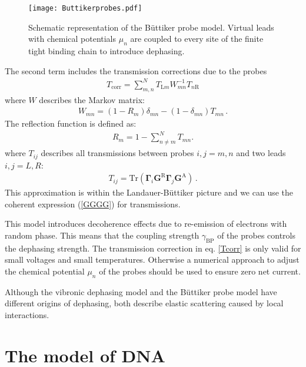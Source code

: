 \documentclass[reprint,superscriptaddress,nofootinbib,amsmath,amssymb,prb,floatfix]{revtex4-1}
\begin{document}
\begin{figure}[b]
   \texttt{[image: Buttikerprobes.pdf]}
   \caption{Schematic representation of the B\"uttiker probe model. Virtual leads with chemical potentials $\mu_n$ are coupled to every site of the finite tight binding chain to introduce dephasing. \label{BPPic}}
\end{figure}

The second term includes the transmission corrections due to the probes
\begin{align}\label{Tcorr}
 T_\text{corr} = \sum_{m,n}^N T_{\text{L}m} W^{-1}_{mn} T_{n\text{R}}
\end{align}
where $W$ describes the Markov matrix:
\begin{align}
  W_{mn} = (1-R_m)\delta_{mn} - (1-\delta_{mn})T_{mn}\,.
\end{align}
The reflection function is defined as:
\begin{align}
    R_m = 1-\sum_{n\neq m}^N T_{mn}.  
\end{align}
%
where $T_{ij}$ describes all transmissions between probes $i,j=m,n$ and two leads $i,j=L,R$:
\begin{align}\label{GGGG}
  T_{ij} = \text{Tr}\left(\boldsymbol{\Gamma}_i \textbf{G}^\text{R} \boldsymbol{\Gamma}_j \textbf{G}^\text{A} \right) \, .
\end{align}
%
This approximation is within the Landauer-B\"uttiker picture and we can use the coherent expression
(\ref{GGGG}) for transmissions.

This model introduces decoherence effects due to re-emission of electrons with random phase. This
means that the coupling strength $\gamma_\text{BP}$ of the probes controls the dephasing
strength. The transmission correction in eq. \eqref{Tcorr} is only valid for small voltages and
small temperatures. Otherwise a numerical approach to adjust the chemical potential $\mu_n$ of the
probes should be used to ensure zero net
current.\cite{golizadeh-mojarad_nonequilibrium_2007,kim_intermediate_2016,Korol1712.08515}

Although the vibronic dephasing model and the B\"uttiker probe model have different origins of
dephasing, both describe elastic scattering caused by local interactions.

\section{The model of DNA}
\label{sec_DNA}
\end{document}
